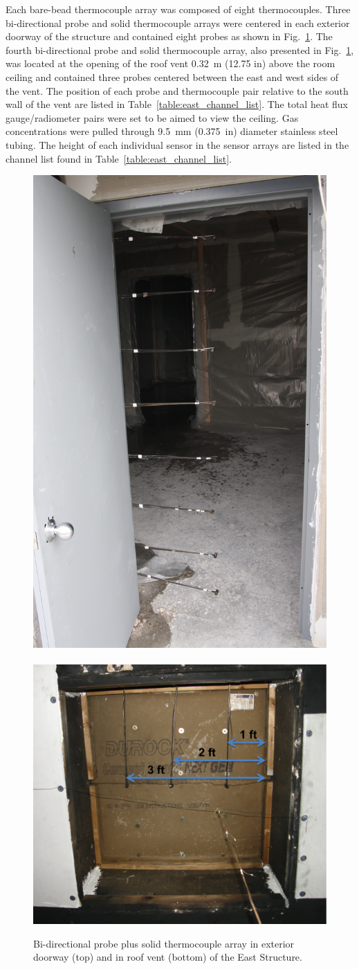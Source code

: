 \documentclass[12pt,oneside]{book}
\begin{document}
Each bare-bead thermocouple array was composed of eight thermocouples. Three bi-directional probe and solid thermocouple arrays were centered in each exterior doorway of the structure and contained eight probes as shown in Fig.~\ref{fig:BDP_arrays}. The fourth bi-directional probe and solid thermocouple array, also presented in Fig.~\ref{fig:BDP_arrays}, was located at the opening of the roof vent 0.32~m (12.75 in) above the room ceiling and contained three probes centered between the east and west sides of the vent. The position of each probe and thermocouple pair relative to the south wall of the vent are listed in Table~\ref{table:east_channel_list}. The total heat flux gauge/radiometer pairs were set to be aimed to view the ceiling. Gas concentrations were pulled through 9.5~mm (0.375~in) diameter stainless steel tubing. The height of each individual sensor in the sensor arrays are listed in the channel list found in Table~\ref{table:east_channel_list}.   

\begin{figure}[!ht]
	\includegraphics[width=0.45\columnwidth]{../Figures/Pictures/doorway_BDPs}
	\\~\\
	\includegraphics[width=0.65\columnwidth]{../Figures/Pictures/roof_vent_BDPs.png}
	\caption[Bi-directional probe plus solid thermocouple arrays in East Structure.]{Bi-directional probe plus solid thermocouple array in exterior doorway (top) and in roof vent (bottom) of the East Structure.}
	\label{fig:BDP_arrays}
\end{figure}
\end{document}
